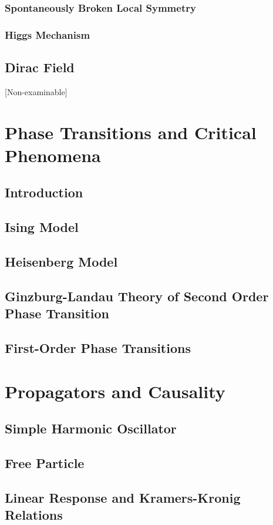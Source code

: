 \documentclass[a4paper]{article}
\theoremstyle{new}
\begin{document}
\subsubsection{Spontaneously Broken Local Symmetry}
\subsubsection{Higgs Mechanism}
\newpage
\subsection{Dirac Field}
[Non-examinable]
\newpage
\section{Phase Transitions and Critical Phenomena}
\subsection{Introduction}
\subsection{Ising Model}
\subsection{Heisenberg Model}
\subsection{Ginzburg-Landau Theory of Second Order Phase Transition}
\subsection{First-Order Phase Transitions}
\newpage
\section{Propagators and Causality}
\subsection{Simple Harmonic Oscillator}
\subsection{Free Particle}
\subsection{Linear Response and Kramers-Kronig Relations}
\end{document}
